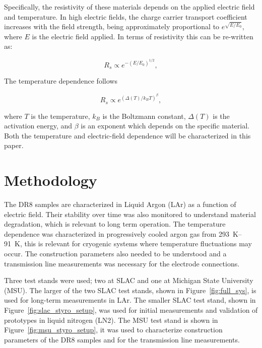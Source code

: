\documentclass[a4paper,12pt]{article}
\newcommand{\DR}{DR8}
\begin{document}
Specifically, the resistivity of these materials depends on the applied electric field and temperature.  
In high electric fields, the charge carrier transport coefficient increases with the field strength, being approximately proportional to $e^{\sqrt{E/E_0}}$, where $E$ is the electric field applied. 
In terms of resistivity this can be re-written as:

\begin{equation}
\label{eq:efield}
{R_s} \propto e^{- (E / E_0)^{1/2}},
\end{equation}

The temperature dependence follows

\begin{equation}
\label{eq:Tdep}
R_s \propto  e^{( \Delta(T) / k_B T)^{\beta}},
\end{equation}

where $T$ is the temperature, $k_B$ is the Boltzmann constant, $\Delta(T)$ is the activation energy, and $\beta$ is an exponent which depends on the specific material.
Both the temperature and electric-field dependence will be characterized in this paper.  


\section{Methodology}
\label{sec:expsetup}

The {\DR} samples are characterized in Liquid Argon (LAr) as a function of electric field.
Their stability over time was also monitored to understand material degradation, which is relevant to long term operation.
The temperature dependence was characterized in progressively cooled argon gas from \SIrange{293}{91}{\kelvin}, this is relevant for cryogenic systems where temperature fluctuations may occur.
The construction parameters also needed to be understood and a transmission line measurements was necessary for the electrode connections.

Three test stands were used; two at SLAC and one at Michigan State University (MSU).
The larger of the two SLAC test stands, shown in Figure~\ref{fig:full_sys}, is used for long-term measurements in LAr.    
The smaller SLAC test stand, shown in Figure~\ref{fig:slac_styro_setup}, was used for initial measurements and validation of prototypes in liquid nitrogen (LN2). 
The MSU test stand is shown in Figure~\ref{fig:msu_styro_setup}, it was used to characterize construction parameters of the {\DR} samples and for the transmission line measurements.  
\end{document}

